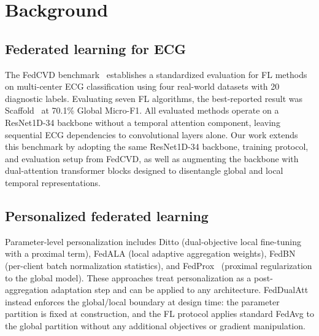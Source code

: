 \documentclass[conference]{IEEEtran}
\begin{document}
{\section{Background}
\label{section II}
\subsection{Federated learning for ECG} The FedCVD benchmark~\cite{fedcvd} establishes a standardized evaluation for FL methods on multi-center ECG classification using four real-world datasets with 20 diagnostic labels. Evaluating seven FL algorithms, the best-reported result was Scaffold~\cite{scaffold} at 70.1\% Global Micro-F1. All evaluated methods operate on a ResNet1D-34 backbone without a temporal attention component, leaving sequential ECG dependencies to convolutional layers alone. Our work extends this benchmark by adopting the same ResNet1D-34 backbone, training protocol, and evaluation setup from FedCVD, as well as augmenting the backbone with dual-attention transformer blocks designed to disentangle global and local temporal representations.

\subsection{Personalized federated learning} Parameter-level personalization includes Ditto (dual-objective local fine-tuning with a proximal term), FedALA (local adaptive aggregation weights), FedBN~\cite{fedbn} (per-client batch normalization statistics), and FedProx~\cite{fedprox} (proximal regularization to the global model). These approaches treat personalization as a post-aggregation adaptation step and can be applied to any architecture. FedDualAtt instead enforces the global/local boundary at design time: the parameter partition is fixed at construction, and the FL protocol applies standard FedAvg to the global partition without any additional objectives or gradient manipulation.

}
\end{document}
